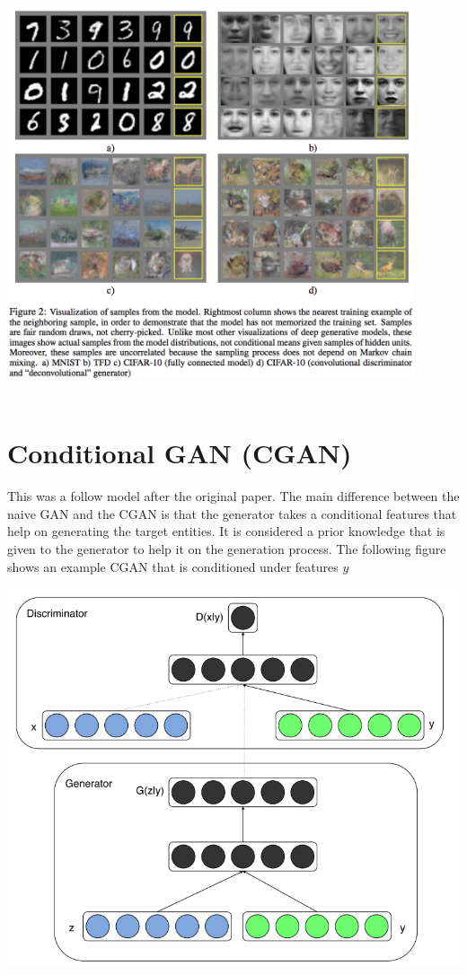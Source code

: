 \documentclass{winnower}
\begin{document}
\begin{center}
\includegraphics[width=12cm, height=12cm]{all.png}
\end{center}

\section{Conditional GAN (CGAN)}
This was a follow model after the original paper. The main difference between the naive GAN and the CGAN is that the generator takes a conditional features that help on generating the target entities. It is considered a prior knowledge that is given to the generator to help it on the generation process. The following figure shows an example CGAN that is conditioned under features \(y\)
\begin{center}
\includegraphics{cgan.png}
\end{center}
\end{document}
